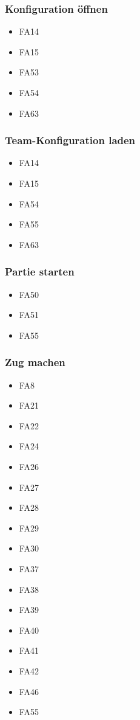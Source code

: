 \subsubsection{Konfiguration öffnen}
\begin{itemize} 
	\item FA14
	\item FA15 
	\item FA53 
	\item FA54 
	\item FA63 
\end{itemize}
\subsubsection{Team-Konfiguration laden}
\begin{itemize} 
	\item FA14
	\item FA15 
	\item FA54 
	\item FA55 
	\item FA63 
\end{itemize}
\subsubsection{Partie starten}
\begin{itemize} 
	\item FA50
	\item FA51 
	\item FA55 
\end{itemize}
\subsubsection{Zug machen}
\begin{itemize} 
	\item FA8
	\item FA21 
	\item FA22 
	\item FA24 
	\item FA26 
	\item FA27 
	\item FA28 
	\item FA29 
	\item FA30 
	\item FA37 
	\item FA38 
	\item FA39 
	\item FA40 
	\item FA41 
	\item FA42 
	\item FA46 
	\item FA55 
\end{itemize}
